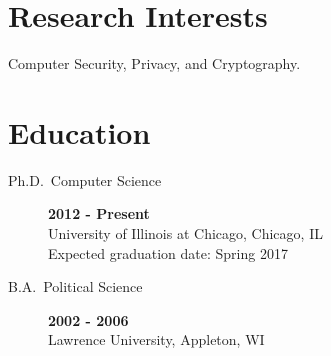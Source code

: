 \documentclass{vitae}
\author{Peter Snyder}
\begin{document}
  \maketitle

  \section{Research Interests}
  \begin{description}
    \item{Computer Security, Privacy, and Cryptography.}
  \end{description}

  \section{Education}
  \begin{description}
    \item[Ph.D.~Computer Science] \hfill \textbf{2012 - Present}\\
    University of Illinois at Chicago, Chicago, IL\\
    Expected graduation date: Spring 2017

    \item[B.A.~Political Science] \hfill \textbf{2002 - 2006}~\\
    Lawrence University, Appleton, WI
  \end{description}

  
    \nocite{cschi}
    \nocite{cscodaspy}
    \nocite{csgcasr}
    \nocite{cloudsweeper}
  
\end{document}
